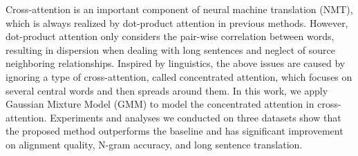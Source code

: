 Cross-attention is an important component of neural machine translation (NMT), which is always realized by dot-product attention in previous methods. However, dot-product attention only considers the pair-wise correlation between words, resulting in dispersion when dealing with long sentences and neglect of source neighboring relationships. Inspired by linguistics, the above issues are caused by ignoring a type of cross-attention, called concentrated attention, which focuses on several central words and then spreads around them. In this work, we apply Gaussian Mixture Model (GMM) to model the concentrated attention in cross-attention. Experiments and analyses we conducted on three datasets show that the proposed method outperforms the baseline and has significant improvement on alignment quality, N-gram accuracy, and long sentence translation.
